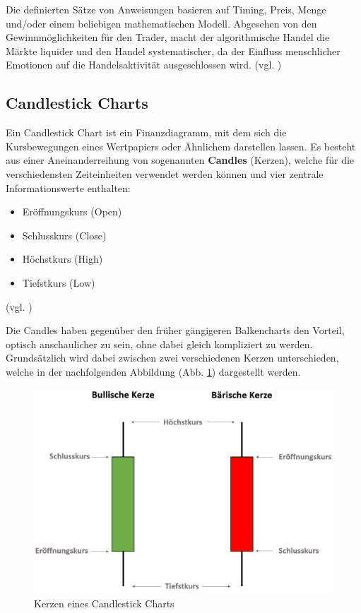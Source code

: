 \documentclass[oneside]{ausarbeitung}
\begin{document}
Die definierten Sätze von Anweisungen basieren auf Timing, Preis,
Menge und/oder einem beliebigen mathematischen Modell. Abgesehen von den
Gewinnmöglichkeiten für den Trader, macht der algorithmische Handel
die Märkte liquider und den Handel systematischer, da der Einfluss
menschlicher Emotionen auf die Handelsaktivität ausgeschlossen wird.
(vgl. \cite{algorithmic_trading})

\subsection{Candlestick Charts}
\label{sub:candlestick_charts}

Ein Candlestick Chart ist ein Finanzdiagramm, mit dem sich die
Kursbewegungen eines Wertpapiers oder Ähnlichem darstellen lassen. Es
besteht aus einer Aneinanderreihung von sogenannten \textbf{Candles}
(Kerzen), welche für die verschiedensten Zeiteinheiten verwendet
werden können und vier zentrale Informationswerte enthalten:

\begin{itemize}
	\item Eröffnungskurs (Open)
	\item Schlusskurs (Close)
	\item Höchstkurs (High)
	\item Tiefstkurs (Low)
\end{itemize}

(vgl. \cite{candlestick_basics})

Die Candles haben gegenüber den früher gängigeren Balkencharts den
Vorteil, optisch anschaulicher zu sein, ohne dabei gleich kompliziert
zu werden. Grundsätzlich wird dabei zwischen zwei verschiedenen
Kerzen unterschieden, welche in der nachfolgenden Abbildung
(Abb. \ref{fig:1}) dargestellt werden. \\

\begin{figure}[H]
  \centering
  \includegraphics[height=0.45\textheight]{img/candles.png}
  \caption{Kerzen eines Candlestick Charts}
  \label{fig:1}
\end{figure}
\end{document}
